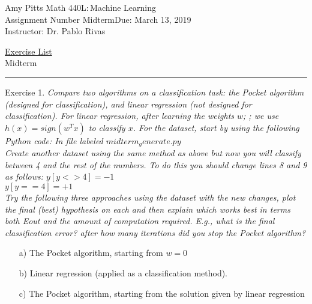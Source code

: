 \documentclass[12pt]{article}
\newcommand{\myname}{Amy Pitts} %
\newcommand{\duedate}{March 13, 2019} %
\newcommand{\courseno}{440L}      %
\newcommand{\coursename}{Machine Learning}    %
\newcommand{\instructorname}{Instructor: Dr. Pablo Rivas} %
\newcommand{\assignumber}{Midterm}   %
\newcommand{\exerciselist}{Midterm}      %
\newcommand{\firstpageinfo}  
    {\textsf{\large\myname}    \hfill     Math \courseno{:}\,\coursename \\
  Assignment Number \assignumber \hfill  Due:  \duedate \\
  \instructorname}
\newenvironment{exercise}[1][]{%
  \bigskip                          %
  \noindent \textsf{Exercise #1.}\slshape }{}
\begin{document}
\thispagestyle{empty}

\noindent\firstpageinfo
\begin{center} \underline{\textsf{Exercise List}}\\[5pt] \exerciselist \end{center}
\medskip\hrule




\begin{exercise}[1] %
  Compare two algorithms on a classification task: the Pocket 
  algorithm (designed for classification), and linear regression 
  (not designed for classification). For linear regression, after 
  learning the weights $w$; ; we use $h(x) = sign(w^T x)$ to 
  classify $x$. For the dataset, start by using the following 
  Python code: In file labeled $midterm_generate.py$ \\
  Create another dataset using the same method as above but now 
  you will classify between 4 and the rest of the numbers. 
  To do this you should change lines 8 and 9 as follows: 
  $y[y<>4] = -1$ \\ $y[y==4] = +1$ \\
  Try the following three approaches using the dataset with 
  the new changes, plot the final (best) hypothesis on each 
  and then explain which works best in terms both Eout and the 
  amount of computation required. E.g., what is the final 
  classification error? after how many iterations did you stop 
  the Pocket algorithm?
  \begin{enumerate}
    \item[a)] The Pocket algorithm, starting from $w = 0$
    \item[b)] Linear regression (applied as a classification method).
    \item[c)] The Pocket algorithm, starting from the solution given by linear regression  
  \end{enumerate}
\end{exercise}
   
\end{document}
